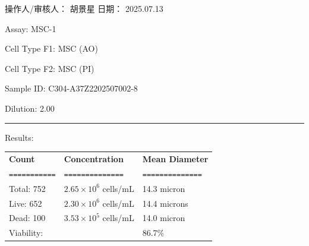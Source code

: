 \documentclass[UTF8,10pt,a4paper,fontset=fandol]{ctexart}
\newcommand{\fieldvalue}[1]{#1}
\newcommand{\handwritten}[1]{#1}
\begin{document}
\vfill

操作人/审核人：%
\fieldvalue{\handwritten{胡景星}}
\hfill
日期：%
\fieldvalue{\handwritten{2025.07.13}}

\newpage

\noindent
Assay: %
\fieldvalue{MSC-1}

\medskip
\noindent
Cell Type F1: %
\fieldvalue{MSC (AO)}

\medskip
\noindent
Cell Type F2: %
\fieldvalue{MSC (PI)}

\medskip
\noindent
Sample ID: %
\fieldvalue{C304-A37Z2202507002-8}

\medskip
\noindent
Dilution: %
\fieldvalue{2.00}

\medskip
\noindent\rule{\textwidth}{0.4pt}

\medskip
\noindent
Results:

\medskip
\small
\begin{tabularx}{\textwidth}{@{}>{\raggedright\arraybackslash}X
>{\raggedright\arraybackslash}X
>{\raggedright\arraybackslash}X@{}}
\textbf{Count} & \textbf{Concentration} & \textbf{Mean Diameter} \\[-1mm]
\texttt{===========} & \texttt{==============} & \texttt{==============} \\

Total:
%
\fieldvalue{752}
&
%
\fieldvalue{$2.65\times10^{6}$ cells/mL}
&
%
\fieldvalue{14.3 micron}
\\

Live:
%
\fieldvalue{652}
&
%
\fieldvalue{$2.30\times10^{6}$ cells/mL}
&
%
\fieldvalue{14.4 microns}
\\

Dead:
%
\fieldvalue{100}
&
%
\fieldvalue{$3.53\times10^{5}$ cells/mL}
&
%
\fieldvalue{14.0 micron}
\\

Viability:
&
&
%
\fieldvalue{86.7\%}
\end{tabularx}
\normalsize
\end{document}
